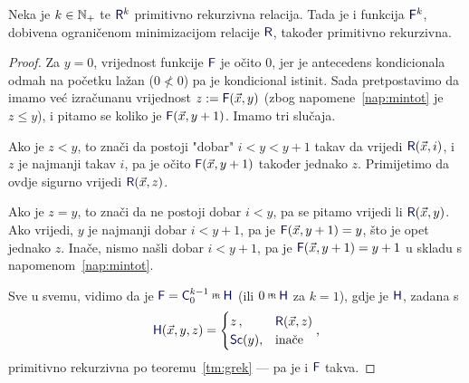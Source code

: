 \begin{propozicija}[{name=[ograničena minimizacija čuva primitivnu rekurzivnost]}]\label{prop:ominprn}
Neka je $k\in{\mathbb N}_+$ te $\f R^k$ primitivno rekurzivna relacija. Tada je i funkcija $\f F^k$\!, dobivena ograničenom minimizacijom relacije $\f R$, također primitivno rekurzivna.
\end{propozicija}
\begin{proof}
	Za $y=0$, vrijednost funkcije $\f F$ je očito $0$, jer je antecedens kondicionala odmah na početku lažan ($0\not<0$) pa je kondicional istinit. Sada pretpostavimo da imamo već izračunanu vrijednost $z:=\f F(\vec x,y)$ (zbog napomene~\ref{nap:mintot} je $z\le y$), i pitamo se koliko je $\f F(\vec x,y+1)$. Imamo tri slučaja.

	Ako je $z<y$, to znači da postoji "dobar" $i<y<y+1$ takav da vrijedi $\f R(\vec x,i)$, i $z$ je najmanji takav $i$, pa je očito $\f F(\vec x,y+1)$ također jednako $z$. Primijetimo da ovdje sigurno vrijedi $\f R(\vec x,z)$.

	Ako je $z=y$, to znači da ne postoji dobar $i<y$, pa se pitamo vrijedi li $\f R(\vec x,y)$. Ako vrijedi, $y$ je najmanji dobar $i<y+1$, pa je $\f F(\vec x,y+1)=y$, što je opet jednako $z$.
	Inače, nismo našli dobar $i<y+1$, pa je $\f F(\vec x,y+1)=y+1$ u skladu s napomenom~\ref{nap:mintot}.

	Sve u svemu, vidimo da je $\f F=\f C_0^{k-1}\pr\f H$ (ili $0\pr\f H$ za $k=1$), gdje je $\f H$, zadana s
\begin{equation}
	\f H(\vec x,y,z)=\begin{cases}
		z\,,&\f R(\vec x,z)\\
		\f{Sc}(y),&\text{inače}
	\end{cases}\text,
\end{equation}
	primitivno rekurzivna po teoremu~\ref{tm:grek} %
	--- pa je i $\f F$ takva.
\end{proof}
